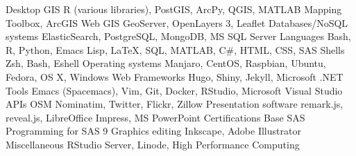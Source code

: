 \begin{cvtechskills}
    \cvtechskill    
        {Desktop GIS}
        {R (various libraries), PostGIS, ArcPy, QGIS, MATLAB Mapping Toolbox, ArcGIS}
        {}
        {}
    \cvtechskill    
        {Web GIS}
        {GeoServer, OpenLayers 3, Leaflet}
        {}
        {}
    \cvtechskill    
        {Databases/NoSQL systems}
        {ElasticSearch, PostgreSQL, MongoDB, MS SQL Server}
        {}
        {}
    \cvtechskill    
        {Languages}
        {Bash, R, Python, Emacs Lisp, LaTeX, SQL, MATLAB, C\#, HTML, CSS, SAS}
        {}
        {}
    \cvtechskill    
        {Shells}
        {Zsh, Bash, Eshell}
        {}
        {}
    \cvtechskill    
        {Operating systems}
        {Manjaro, CentOS, Raspbian, Ubuntu, Fedora, OS X, Windows}
        {}
        {}  
    \cvtechskill    
        {Web Frameworks}
        {Hugo, Shiny, Jekyll, Microsoft .NET}
        {}
        {}  
    \cvtechskill
        {Tools}
        {Emacs (Spacemacs), Vim, Git, Docker, RStudio, Microsoft Visual Studio}
        {}
        {}
    \cvtechskill    
        {APIs}
        {OSM Nominatim, Twitter, Flickr, Zillow}
        {}
        {}
    \cvtechskill    
        {Presentation software}
        {remark.js, reveal.js, LibreOffice Impress, MS PowerPoint}
        {}
        {}
    \cvtechskill
        {Certifications}
        {Base SAS Programming for SAS 9}
        {}
        {}
    \cvtechskill
        {Graphics editing}
        {Inkscape, Adobe Illustrator}
        {}
        {}
    \cvtechskill
        {Miscellaneous}
        {RStudio Server, Linode, High Performance Computing}
        {}
        {}
\end{cvtechskills}